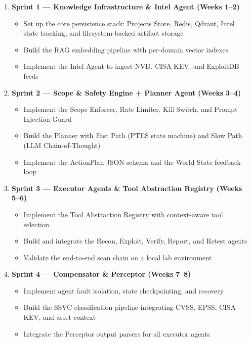 \documentclass[12pt,a4paper]{report}
\begin{document}
\begin{enumerate}
    \item \textbf{Sprint 1 --- Knowledge Infrastructure \& Intel Agent (Weeks 1--2)}
    \begin{itemize}
        \item Set up the core persistence stack: Projects Store, Redis, Qdrant,
        Intel state tracking, and filesystem-backed artifact storage
        \item Build the RAG embedding pipeline with per-domain vector indexes
        \item Implement the Intel Agent to ingest NVD, CISA KEV, and ExploitDB feeds
    \end{itemize}

    \item \textbf{Sprint 2 --- Scope \& Safety Engine + Planner Agent (Weeks 3--4)}
    \begin{itemize}
        \item Implement the Scope Enforcer, Rate Limiter, Kill Switch, and
        Prompt Injection Guard
        \item Build the Planner with Fast Path (PTES state machine) and
        Slow Path (LLM Chain-of-Thought)
        \item Implement the ActionPlan JSON schema and the World State feedback loop
    \end{itemize}

    \item \textbf{Sprint 3 --- Executor Agents \& Tool Abstraction Registry (Weeks 5--6)}
    \begin{itemize}
        \item Implement the Tool Abstraction Registry with context-aware tool selection
        \item Build and integrate the Recon, Exploit, Verify, Report, and Retest agents
        \item Validate the end-to-end scan chain on a local lab environment
    \end{itemize}

    \item \textbf{Sprint 4 --- Compensator \& Perceptor (Weeks 7--8)}
    \begin{itemize}
        \item Implement agent fault isolation, state checkpointing, and recovery
        \item Build the SSVC classification pipeline integrating CVSS, EPSS,
        CISA KEV, and asset context
        \item Integrate the Perceptor output parsers for all executor agents
    \end{itemize}


\end{enumerate}
\end{document}
